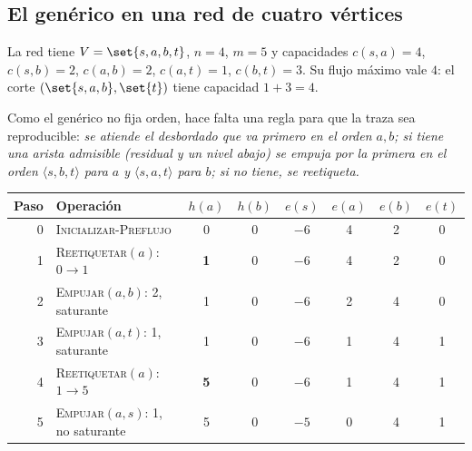 \documentclass[11pt,letterpaper]{article}
\begin{document}
\subsection*{El genérico en una red de cuatro vértices}

\begin{ejemplo}
  \label{ej:push-generico}
  La red tiene $V = \set{s, a, b, t}$, $n = 4$, $m = 5$ y capacidades
  $c(s, a) = 4$, $c(s, b) = 2$, $c(a, b) = 2$, $c(a, t) = 1$,
  $c(b, t) = 3$. Su flujo máximo vale $4$: el corte
  $(\set{s, a, b}, \set{t})$ tiene capacidad $1 + 3 = 4$.
  \begin{center}
  \end{center}
  Como el genérico no fija orden, hace falta una regla para que la
  traza sea reproducible: \emph{se atiende el desbordado que va primero
  en el orden $a, b$; si tiene una arista admisible (residual y un
  nivel abajo) se empuja por la primera en el orden
  $\langle s, b, t\rangle$ para $a$ y $\langle s, a, t\rangle$ para
  $b$; si no tiene, se reetiqueta.}
  \begin{center}
  \small
  \begin{tabular}{rlcccccc}
    \toprule
    \textbf{Paso} & \textbf{Operación} & $h(a)$ & $h(b)$
      & $e(s)$ & $e(a)$ & $e(b)$ & $e(t)$ \\
    \midrule
    0 & \textsc{Inicializar-Preflujo} & 0 & 0 & $-6$ & 4 & 2 & 0 \\
    1 & \textsc{Reetiquetar}$(a)$: $0 \to 1$ & \textbf{1} & 0
      & $-6$ & 4 & 2 & 0 \\
    2 & \textsc{Empujar}$(a, b)$: 2, saturante & 1 & 0
      & $-6$ & 2 & 4 & 0 \\
    3 & \textsc{Empujar}$(a, t)$: 1, saturante & 1 & 0
      & $-6$ & 1 & 4 & 1 \\
    4 & \textsc{Reetiquetar}$(a)$: $1 \to 5$ & \textbf{5} & 0
      & $-6$ & 1 & 4 & 1 \\
    5 & \textsc{Empujar}$(a, s)$: 1, no saturante & 5 & 0
      & $-5$ & 0 & 4 & 1 \\

\end{tabular}
\end{center}
\end{ejemplo}
\end{document}
